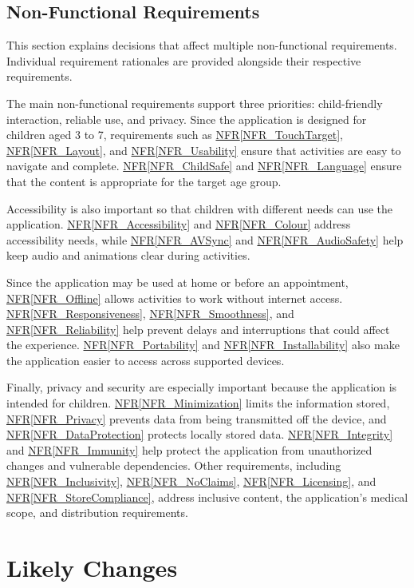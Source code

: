 \documentclass[12pt]{article}
\newcommand{\nfrref}[1]{\hyperref[#1]{NFR\ref*{#1}}}
\begin{document}
\subsection{Non-Functional Requirements}

This section explains decisions that affect multiple non-functional requirements. Individual
requirement rationales are provided alongside their respective requirements.

The main non-functional requirements support three priorities: child-friendly
interaction, reliable use, and privacy. Since the application is designed for
children aged 3 to 7, requirements such as \nfrref{NFR_TouchTarget},
\nfrref{NFR_Layout}, and \nfrref{NFR_Usability} ensure that activities are
easy to navigate and complete. \nfrref{NFR_ChildSafe} and
\nfrref{NFR_Language} ensure that the content is appropriate for the target
age group.

Accessibility is also important so that children with different needs can
use the application. \nfrref{NFR_Accessibility} and \nfrref{NFR_Colour}
address accessibility needs, while \nfrref{NFR_AVSync} and
\nfrref{NFR_AudioSafety} help keep audio and animations clear during
activities.

Since the application may be used at home or before an appointment,
\nfrref{NFR_Offline} allows activities to work without internet access.
\nfrref{NFR_Responsiveness}, \nfrref{NFR_Smoothness}, and
\nfrref{NFR_Reliability} help prevent delays and interruptions that could
affect the experience. \nfrref{NFR_Portability} and
\nfrref{NFR_Installability} also make the application easier to access
across supported devices.

Finally, privacy and security are especially important because the
application is intended for children. \nfrref{NFR_Minimization} limits
the information stored, \nfrref{NFR_Privacy} prevents data from being
transmitted off the device, and \nfrref{NFR_DataProtection} protects
locally stored data. \nfrref{NFR_Integrity} and \nfrref{NFR_Immunity}
help protect the application from unauthorized changes and vulnerable
dependencies. Other requirements, including \nfrref{NFR_Inclusivity},
\nfrref{NFR_NoClaims}, \nfrref{NFR_Licensing}, and
\nfrref{NFR_StoreCompliance}, address inclusive content, the application's
medical scope, and distribution requirements.

\section{Likely Changes}
\label{sec_LikelyChanges}
\end{document}
